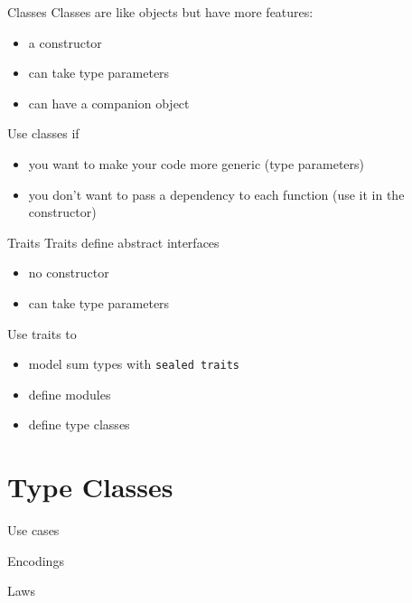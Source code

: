 \documentclass[10pt]{beamer}
\begin{document}
  \begin{frame}{Classes}
    Classes are like objects but have more features:
    \begin{itemize}
      \item a constructor
      \item can take type parameters
      \item can have a companion object
    \end{itemize}
    Use classes if
    \begin{itemize}
      \item you want to make your code more generic (type parameters)
      \item you don't want to pass a dependency to each function (use it in the constructor)
    \end{itemize}
  \end{frame}

  \begin{frame}{Traits}
    Traits define abstract interfaces
    \begin{itemize}
      \item no constructor
      \item can take type parameters
    \end{itemize}
    Use traits to
    \begin{itemize}
      \item model sum types with \texttt{sealed traits}
      \item define modules
      \item define type classes
    \end{itemize}
  \end{frame}

  \section{Type Classes}
  \begin{frame}{Use cases}
  \end{frame}

  \begin{frame}{Encodings}
  \end{frame}

  \begin{frame}{Laws}
  \end{frame}
\end{document}
